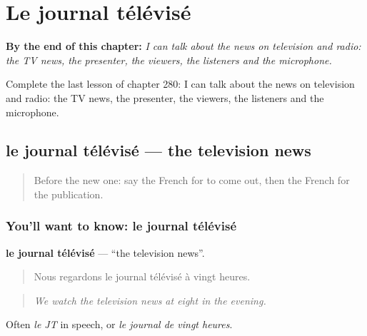 
\chapter{Le journal télévisé}
\label{ch:fr-le-journal-televise}

\begin{chapteropening}
\textbf{By the end of this chapter:} \emph{I can talk about the news on television and radio: the TV news, the presenter, the viewers, the listeners and the microphone.}

Complete the last lesson of chapter 280: I can talk about the news on television and radio: the TV news, the presenter, the viewers, the listeners and the microphone.
\end{chapteropening}

\section[le journal télévisé]{le journal télévisé — the television news}

\label{lesson:FR-C280-journal-televise}



\begin{quote}
Before the new one: say the French for to come out, then the French for the publication.
\end{quote}

\subsection*{You'll want to know: le journal télévisé}
\textbf{le journal télévisé} — \textquotedblleft{}the television news\textquotedblright{}.

\begin{quote}
Nous regardons le journal télévisé à vingt heures.
\end{quote}

\begin{quote}
\emph{We watch the television news at eight in the evening.}
\end{quote}

Often \emph{le JT} in speech, or \emph{le journal de vingt heures}.


